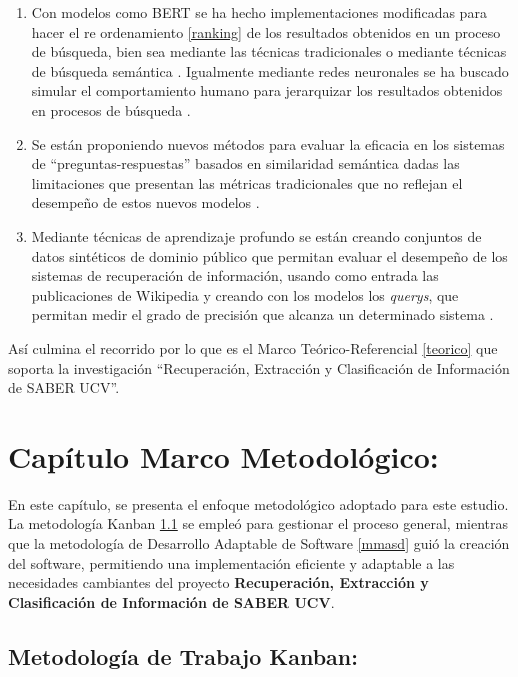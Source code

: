 \documentclass[
  12pt,
  openany]{book}
\begin{document}
\begin{enumerate}
\def\labelenumi{\arabic{enumi}.}
\item
  Con modelos como BERT se ha hecho implementaciones modificadas para hacer el re ordenamiento \ref{ranking} de los resultados obtenidos en un proceso de búsqueda, bien sea mediante las técnicas tradicionales o mediante técnicas de búsqueda semántica\citep{nogueira2019} . Igualmente mediante redes neuronales se ha buscado simular el comportamiento humano para jerarquizar los resultados obtenidos en procesos de búsqueda \citep{pang2017}.
\item
  Se están proponiendo nuevos métodos para evaluar la eficacia en los sistemas de ``preguntas-respuestas'' basados en similaridad semántica dadas las limitaciones que presentan las métricas tradicionales que no reflejan el desempeño de estos nuevos modelos \citep{risch2021}.
\item
  Mediante técnicas de aprendizaje profundo se están creando conjuntos de datos sintéticos de dominio público que permitan evaluar el desempeño de los sistemas de recuperación de información, usando como entrada las publicaciones de Wikipedia y creando con los modelos los \emph{querys}, que permitan medir el grado de precisión que alcanza un determinado sistema \citep{frej-etal-2020-wikir}.
\end{enumerate}

Así culmina el recorrido por lo que es el Marco Teórico-Referencial \ref{teorico} que soporta la investigación ``Recuperación, Extracción y Clasificación de Información de SABER UCV''.

\hypertarget{mm}{%
\chapter{Capítulo Marco Metodológico:}\label{mm}}

En este capítulo, se presenta el enfoque metodológico adoptado para este estudio. La metodología Kanban \ref{mmmetodologia} se empleó para gestionar el proceso general, mientras que la metodología de Desarrollo Adaptable de Software \ref{mmasd} guió la creación del software, permitiendo una implementación eficiente y adaptable a las necesidades cambiantes del proyecto \textbf{Recuperación, Extracción y Clasificación de Información de SABER UCV}.

\hypertarget{mmmetodologia}{%
\section{Metodología de Trabajo Kanban:}\label{mmmetodologia}}
\end{document}

